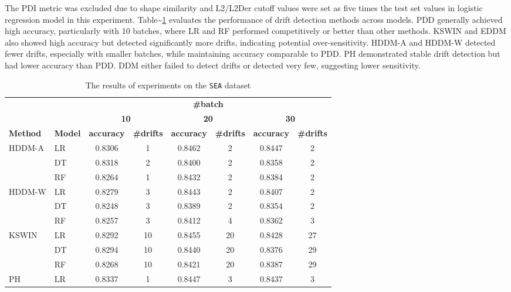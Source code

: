 The PDI metric was excluded due to shape similarity and L2/L2Der cutoff values were set as five times the test set values in logistic regression model in this experiment. Table\textasciitilde{}\ref{tab:exp_SEA} evaluates the performance of drift detection methods across models. PDD generally achieved high accuracy, particularly with 10 batches, where LR and RF performed competitively or better than other methods. KSWIN and EDDM also showed high accuracy but detected significantly more drifts, indicating potential over-sensitivity. HDDM-A and HDDM-W detected fewer drifts, especially with smaller batches, while maintaining accuracy comparable to PDD. PH demonstrated stable drift detection but had lower accuracy than PDD. DDM either failed to detect drifts or detected very few, suggesting lower sensitivity.

\begin{table}[H]
    \centering
    \small
    \caption{The results of experiments on the \texttt{SEA} dataset}
    \label{tab:exp_SEA}
    \begin{tabular}{llcccccc}\toprule
        && \multicolumn{6}{c}{\textbf{\#batch}}\\\cmidrule(lr){3-8}
        && \multicolumn{2}{c}{\textbf{10}}    & \multicolumn{2}{c}{\textbf{20}} & \multicolumn{2}{c}{\textbf{30}} \\\cmidrule(lr){3-8}
        \textbf{Method} & \textbf{Model} & \textbf{accuracy} & \textbf{\#drifts} & \textbf{accuracy} & \textbf{\#drifts} & \textbf{accuracy} & \textbf{\#drifts} \\\midrule
        HDDM-A & LR & 0.8306 & 1 & 0.8462 & 2 & 0.8447 & 2 \\
        & DT & 0.8318 & 2 & 0.8400 & 2 & 0.8358 & 2 \\
        & RF & 0.8264 & 1 & 0.8432 & 2 & 0.8384 & 2 \\
        \midrule
        HDDM-W & LR & 0.8279 & 3 & 0.8443 & 2 & 0.8407 & 2 \\
        & DT & 0.8248 & 3 & 0.8389 & 2 & 0.8354 & 2 \\
        & RF & 0.8257 & 3 & 0.8412 & 4 & 0.8362 & 3 \\
        \midrule
        KSWIN & LR & 0.8292 & 10 & 0.8455 & 20 & 0.8428 & 27 \\
        & DT & 0.8294 & 10 & 0.8440 & 20 & 0.8376 & 29 \\
        & RF & 0.8268 & 10 & 0.8421 & 20 & 0.8387 & 29 \\
        \midrule
        PH & LR & 0.8337 & 1 & 0.8447 & 3 & 0.8437 & 3 \\

\end{tabular}
\end{table}
